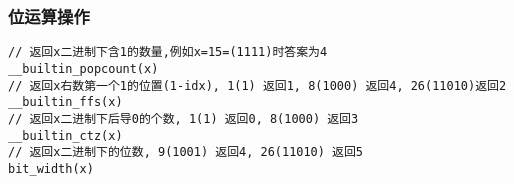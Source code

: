 \subsubsection{位运算操作}
\begin{lstlisting}
// 返回x二进制下含1的数量,例如x=15=(1111)时答案为4
__builtin_popcount(x)
// 返回x右数第一个1的位置(1-idx), 1(1) 返回1, 8(1000) 返回4, 26(11010)返回2
__builtin_ffs(x)
// 返回x二进制下后导0的个数, 1(1) 返回0, 8(1000) 返回3
__builtin_ctz(x)
// 返回x二进制下的位数, 9(1001) 返回4, 26(11010) 返回5
bit_width(x)  
\end{lstlisting}